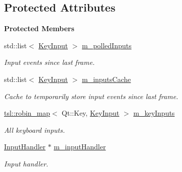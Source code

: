\subsection*{Protected Attributes}
\begin{Indent}\textbf{ Protected Members}\par
\begin{DoxyCompactItemize}
\item 
\mbox{\label{classrev_1_1_key_handler_a5724f28514a2cf7063a19c52bf11ddb7}} 
std\+::list$<$ \mbox{\hyperlink{structrev_1_1_key_input}{Key\+Input}} $>$ \mbox{\hyperlink{classrev_1_1_key_handler_a5724f28514a2cf7063a19c52bf11ddb7}{m\+\_\+polled\+Inputs}}
\begin{DoxyCompactList}\small\item\em Input events since last frame. \end{DoxyCompactList}\item 
\mbox{\label{classrev_1_1_key_handler_a8139916d687fb2226ce63c76ecd31a39}} 
std\+::list$<$ \mbox{\hyperlink{structrev_1_1_key_input}{Key\+Input}} $>$ \mbox{\hyperlink{classrev_1_1_key_handler_a8139916d687fb2226ce63c76ecd31a39}{m\+\_\+inputs\+Cache}}
\begin{DoxyCompactList}\small\item\em Cache to temporarily store input events since last frame. \end{DoxyCompactList}\item 
\mbox{\label{classrev_1_1_key_handler_a2b7f130f109ecf2702d5c4fd0a615612}} 
\mbox{\hyperlink{classtsl_1_1robin__map}{tsl\+::robin\+\_\+map}}$<$ Qt\+::\+Key, \mbox{\hyperlink{structrev_1_1_key_input}{Key\+Input}} $>$ \mbox{\hyperlink{classrev_1_1_key_handler_a2b7f130f109ecf2702d5c4fd0a615612}{m\+\_\+key\+Inputs}}
\begin{DoxyCompactList}\small\item\em All keyboard inputs. \end{DoxyCompactList}\item 
\mbox{\label{classrev_1_1_key_handler_a9f3037d7aa7ad5e8fa05d34d2c80a458}} 
\mbox{\hyperlink{classrev_1_1_input_handler}{Input\+Handler}} $\ast$ \mbox{\hyperlink{classrev_1_1_key_handler_a9f3037d7aa7ad5e8fa05d34d2c80a458}{m\+\_\+input\+Handler}}
\begin{DoxyCompactList}\small\item\em Input handler. \end{DoxyCompactList}\end{DoxyCompactItemize}
\end{Indent}
